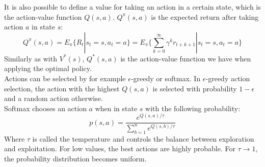 \documentclass[a4paper, 11pt]{article}
\begin{document}
It is also possible to define a value for taking an action in a certain state, which is the action-value function $Q(s,a)$. $Q^\pi(s,a)$ is the expected return after taking action $a$ in state $s$:
\begin{equation}
Q^\pi(s,a) = E_\pi\{R_t|s_t=s,a_t=a\}=E_\pi\big \{ \sum_{k=0}^{\infty}\gamma^k r_{t+k+1} | s_t=s,a_t=a\big \}
\end{equation}
Similarly as with $V^*(s)$, $Q^*(s,a)$ is the action-value function we have when applying the optimal policy.\\
Actions can be selected by for example $\epsilon$-greedy or softmax. In $\epsilon$-greedy action selection, the action with the highest $Q(s,a)$ is selected with probability $1-\epsilon$ and a random action otherwise.\\
Softmax chooses an action $a$ when in state $s$ with the following probability:
\begin{equation}
p(s,a) = \frac{e^{Q(s,a)/\tau}}{\sum_{b=1}^n e^{Q(s,b)/\tau}}
\end{equation}
Where $\tau$ is called the temperature and controls the balance between exploration and exploitation. For low values, the best actions are highly probable. For $\tau \to 1$, the probability distribution becomes uniform.\\

\end{document}
